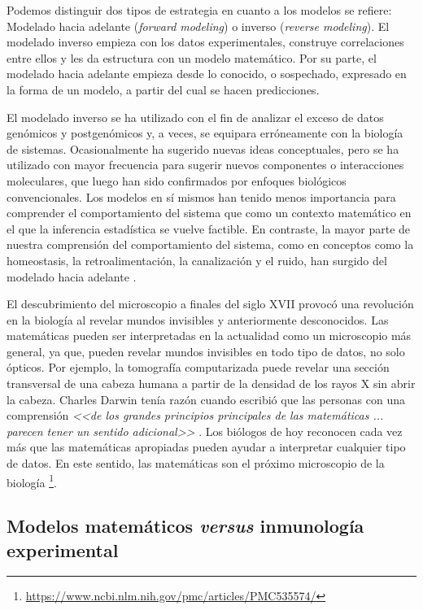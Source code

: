 Podemos distinguir dos tipos de estrategia en cuanto a los modelos se refiere: Modelado hacia adelante (\textit{forward modeling}) o inverso (\textit{reverse modeling}). El modelado inverso empieza con los datos experimentales, construye correlaciones entre ellos y les da estructura con un modelo matemático. Por su parte, el modelado hacia adelante empieza desde lo conocido, o sospechado, expresado en la forma de un modelo, a partir del cual se hacen predicciones. 

El modelado inverso se ha utilizado con el fin de analizar el exceso de datos genómicos y postgenómicos y, a veces, se equipara erróneamente con la biología de sistemas. Ocasionalmente ha sugerido nuevas ideas conceptuales, pero se ha utilizado con mayor frecuencia para sugerir nuevos componentes o interacciones moleculares, que luego han sido confirmados por enfoques biológicos convencionales. Los modelos en sí mismos han tenido menos importancia para comprender el comportamiento del sistema que como un contexto matemático en el que la inferencia estadística se vuelve factible. En contraste, la mayor parte de nuestra comprensión del comportamiento del sistema, como en conceptos como la homeostasis, la retroalimentación, la canalización y el ruido, han surgido del modelado hacia adelante \citep{Gunawardena2014}.

El descubrimiento del microscopio a finales del siglo XVII provocó una revolución en la biología al revelar mundos invisibles y anteriormente desconocidos. Las matemáticas pueden ser interpretadas en la actualidad como un microscopio más general, ya que, pueden revelar mundos invisibles en todo tipo de datos, no solo ópticos. Por ejemplo, la tomografía computarizada puede revelar una sección transversal de una cabeza humana a partir de la densidad de los rayos X sin abrir la cabeza. Charles Darwin tenía razón cuando escribió que las personas con una comprensión \textit{<<de los grandes principios principales de las matemáticas ... parecen tener un sentido adicional>>} \citep{darwin1887life}. Los biólogos de hoy reconocen cada vez más que las matemáticas apropiadas pueden ayudar a interpretar cualquier tipo de datos. En este sentido, las matemáticas son el próximo microscopio de la biología \footnote{\url{https://www.ncbi.nlm.nih.gov/pmc/articles/PMC535574/}}.

\subsection{Modelos matemáticos \textit{versus} inmunología experimental}

